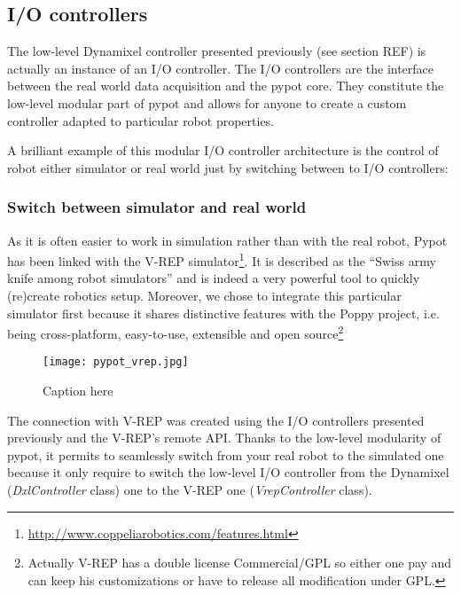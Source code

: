 \subsection{I/O controllers} %

The low-level Dynamixel controller presented previously (see section REF) is actually an instance of an I/O controller. The I/O controllers are the interface between the real world data acquisition and the pypot core. They constitute the low-level modular part of pypot and allows for anyone to create a custom controller adapted to particular robot properties.

A brilliant example of this modular I/O controller architecture is the control of robot either simulator or real world just by switching between to I/O controllers:

\subsubsection{Switch between simulator and real world} %

As it is often easier to work in simulation rather than with the real robot, Pypot has been linked with the V-REP simulator\footnote{\url{http://www.coppeliarobotics.com/features.html}}. It is described as the “Swiss army knife among robot simulators” and is indeed a very powerful tool to quickly (re)create robotics setup. Moreover, we chose to integrate this particular simulator first because it shares distinctive features with the Poppy project, i.e. being cross-platform, easy-to-use, extensible and open source\footnote{Actually V-REP has a double license Commercial/GPL so either one pay and can keep his customizations or have to release all modification under GPL.}

\begin{figure}[tb]
    \begin{center}
        \texttt{[image: pypot\_vrep.jpg]}
    \end{center}
    \caption{Caption here}
    \label{fig:pypot-vrep}
\end{figure}


The connection with V-REP was created using the I/O controllers presented previously and the V-REP’s remote API.
Thanks to the low-level modularity of pypot, it permits to seamlessly switch from your real robot to the simulated one because it only require to switch the low-level I/O controller from the Dynamixel (\emph{DxlController} class) one to the V-REP one (\emph{VrepController} class).

